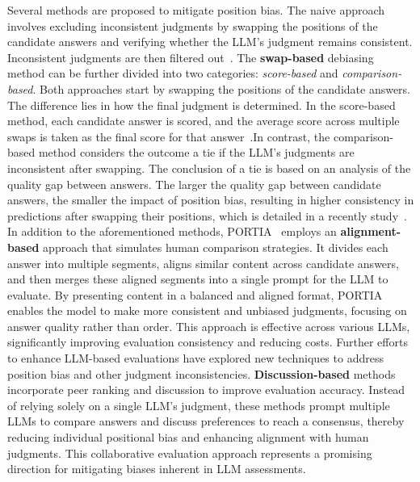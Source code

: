 Several methods are proposed to mitigate position bias. 
The naive approach involves excluding inconsistent judgments by swapping the positions of the candidate answers and verifying whether the LLM's judgment remains consistent. Inconsistent judgments are then filtered out~\cite{zheng2023judging,chen2024humans,wang2023large,li2023generative,zheng2023large,li2024calibraeval}.
The \textbf{swap-based} debiasing method can be further divided into two categories: \textit{score-based} and \textit{comparison-based}. Both approaches start by swapping the positions of the candidate answers. The difference lies in how the final judgment is determined. In the score-based method, each candidate answer is scored, and the average score across multiple swaps is taken as the final score for that answer~\cite{zheng2023judging,wang2023large,li2023generative,raina2024llm,hou2024large}.In contrast, the comparison-based method considers the outcome a tie if the LLM's judgments are inconsistent after swapping.
The conclusion of a tie is based on an analysis of the quality gap between answers. The larger the quality gap between candidate answers, the smaller the impact of position bias, resulting in higher consistency in predictions after swapping their positions, which is detailed in a recently study~\cite{llmsjuding2024openreview}.
In addition to the aforementioned methods, PORTIA~\cite{li2023split} employs an \textbf{alignment-based} approach that simulates human comparison strategies. It divides each answer into multiple segments, aligns similar content across candidate answers, and then merges these aligned segments into a single prompt for the LLM to evaluate. By presenting content in a balanced and aligned format, PORTIA enables the model to make more consistent and unbiased judgments, focusing on answer quality rather than order. This approach is effective across various LLMs, significantly improving evaluation consistency and reducing costs.
Further efforts to enhance LLM-based evaluations have explored new techniques to address position bias and other judgment inconsistencies. \textbf{Discussion-based} methods~\cite{li2023prd,khan2024debating} incorporate peer ranking and discussion to improve evaluation accuracy. Instead of relying solely on a single LLM’s judgment, these methods prompt multiple LLMs to compare answers and discuss preferences to reach a consensus, thereby reducing individual positional bias and enhancing alignment with human judgments. This collaborative evaluation approach represents a promising direction for mitigating biases inherent in LLM assessments.


